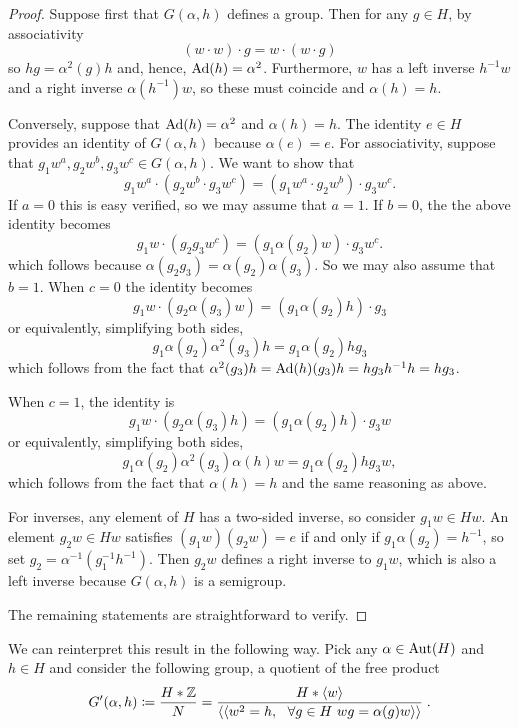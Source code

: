 \begin{proof}
	Suppose first that $G(\alpha, h)$ defines a group. Then for any $g \in H$, by associativity
    \[
        (w \cdot w) \cdot g = w \cdot (w \cdot g)
    \]
    so $hg = \alpha^2(g)h$ and, hence, $\operatorname{Ad}(h) = \alpha^2$. Furthermore, $w$ has a left inverse $h^{-1} w$ and a right inverse $\alpha(h^{-1}) w$, so these must coincide and $\alpha(h) = h$.
    
    Conversely, suppose that $\operatorname{Ad}(h) = \alpha^2$ and $\alpha(h) = h$. The identity $e \in H$ provides an identity of $G(\alpha, h)$ because $\alpha(e) = e$. For associativity, suppose that $g_1 w^a, g_2 w^b, g_3 w^c \in G(\alpha, h)$. We want to show that
	\[
		g_1 w^a \cdot (g_2 w^b \cdot g_3 w^c) = (g_1 w^a \cdot g_2 w^b) \cdot g_3 w^c.
	\] 
	If $a = 0$ this is easy verified, so we may assume that $a = 1$. If $b = 0$, the the above identity becomes
	\[
	g_1 w \cdot (g_2 g_3 w^c) = (g_1 \alpha(g_2) w) \cdot g_3 w^c.
	\]
	which follows because $\alpha(g_2 g_3) = \alpha(g_2) \alpha(g_3)$. So we may also assume that $b = 1$. When $c= 0$ the identity becomes
	\[
	g_1 w \cdot (g_2 \alpha(g_3) w) = (g_1 \alpha(g_2) h) \cdot g_3
	\]
	or equivalently, simplifying both sides,
	\[
	g_1 \alpha(g_2) \alpha^2(g_3) h = g_1 \alpha(g_2) h g_3
	\]
	which follows from the fact that $\alpha^2(g_3) h = \operatorname{Ad}(h)(g_3) h = h g_3 h^{-1} h = h g_3$.
	
	When $c = 1$, the identity is
		\[
	g_1 w \cdot (g_2 \alpha(g_3) h) = (g_1 \alpha(g_2) h) \cdot g_3 w
	\]
	or equivalently, simplifying both sides,
	\[
	g_1 \alpha(g_2) \alpha^2(g_3) \alpha(h) w = g_1 \alpha(g_2) h g_3 w,
	\]
	which follows from the fact that $\alpha(h) = h$ and the same reasoning as above.
	
	For inverses, any element of $H$ has a two-sided inverse, so consider $g_1 w \in Hw$. An element $g_2 w \in Hw$ satisfies $(g_1 w)(g_2 w) = e$
        if and only if $g_1 \alpha(g_2) = h^{-1}$, so set $g_2 = \alpha^{-1}(g_1^{-1} h^{-1})$. Then $g_2 w$ defines a right inverse to $g_1 w$, which is also a left inverse because $G(\alpha, h)$ is a semigroup.
	
	The remaining statements are straightforward to verify.
\end{proof}
We can reinterpret this result in the following way. Pick any $\alpha \in \operatorname{Aut}(H)$ and $h \in H$ and
consider the following group, a quotient of the free product 
\[
G' (\alpha, h) \coloneqq \frac{H\ast {\mathbb Z}}{N} = \frac{H \ast \langle w \rangle}{\langle \langle w^2=h, \  \ \forall g\in H  \ wg = \alpha (g) w \rangle \rangle} \; .
\]
